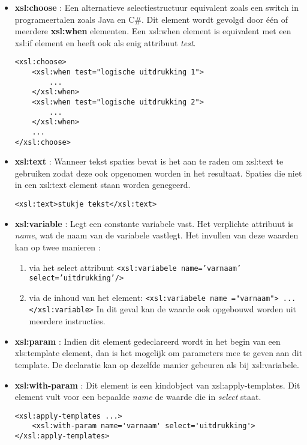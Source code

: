 \documentclass{report}
\begin{document}
\begin{itemize}
		\item \textbf{xsl:choose} : Een alternatieve selectiestructuur equivalent zoals een switch in programeertalen zoals Java en C\#. Dit element wordt gevolgd door één of meerdere \textbf{xsl:when} elementen. Een xsl:when element is equivalent met een xsl:if element en heeft ook als enig attribuut \textit{test}.
		\begin{lstlisting}
<xsl:choose>
	<xsl:when test="logische uitdrukking 1">
		... 
	</xsl:when>
	<xsl:when test="logische uitdrukking 2"> 
		... 
	</xsl:when>
	...
</xsl:choose>
		\end{lstlisting}
		
		\item \textbf{xsl:text} : Wanneer tekst spaties bevat is het aan te raden om xsl:text te gebruiken zodat deze ook opgenomen worden in het resultaat. Spaties die niet in een xsl:text element staan worden genegeerd.
		
		\texttt{<xsl:text>stukje tekst</xsl:text>}
		
		\item \textbf{xsl:variable} : Legt een constante variabele vast. Het verplichte attribuut is \textit{name}, wat de naam van de variabele vastlegt. Het invullen van deze waarden kan op twee manieren :
		\begin{enumerate}
			\item via het select attribuut \texttt{<xsl:variabele name='varnaam' select='uitdrukking'/>}
			\item via de inhoud van het element: \texttt{<xsl:variabele name ="varnaam">
				...
			</xsl:variable>}
			In dit geval kan de waarde ook opgebouwd worden uit meerdere instructies.
		\end{enumerate}
	
		\item \textbf{xsl:param} : Indien dit element gedeclareerd wordt in het begin van een xls:template element, dan is het mogelijk om parameters mee te geven aan dit template. De declaratie kan op dezelfde manier gebeuren als bij xsl:variabele.
		
		\item \textbf{xsl:with-param} : Dit element is een kindobject van xsl:apply-templates. Dit element vult voor een bepaalde \textit{name} de waarde die in \textit{select} staat.
		
		\begin{lstlisting}
<xsl:apply-templates ...>
	<xsl:with-param name='varnaam' select='uitdrukking'>
</xsl:apply-templates>
		\end{lstlisting} 
	\end{itemize}
\end{document}
